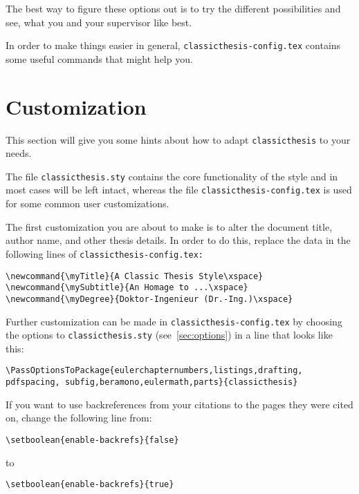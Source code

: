 \noindent The best way to figure these options out is to try the different possibilities and see, what you and your supervisor like best.

In order to make things easier in general, \texttt{classicthesis-config.tex} contains some useful commands that might help you.


\section{Customization}\label{sec:custom}

This section will give you some hints about how to adapt \texttt{classicthesis} to your needs.

The file \texttt{classicthesis.sty} contains the core functionality of the style and in most cases will be left intact, whereas the file \texttt{classic\-thesis-config.tex} is used for some common user customizations. 

The first customization you are about to make is to alter the document title, author name, and other thesis details. In order to do this, replace the data in the following lines of \texttt{classicthesis-config.tex:}

\begin{lstlisting}[frame=lt]
\newcommand{\myTitle}{A Classic Thesis Style\xspace}
\newcommand{\mySubtitle}{An Homage to ...\xspace}
\newcommand{\myDegree}{Doktor-Ingenieur (Dr.-Ing.)\xspace}
\end{lstlisting}

Further customization can be made in \texttt{classicthesis-config.tex} by choosing the options to \texttt{classicthesis.sty} (see~\autoref{sec:options}) in a line that looks like this:

\begin{lstlisting}[frame=lt]
\PassOptionsToPackage{eulerchapternumbers,listings,drafting, pdfspacing, subfig,beramono,eulermath,parts}{classicthesis}

\end{lstlisting}

If you want to use backreferences from your citations to the pages they were cited on, change the following line from:
\begin{lstlisting}[breaklines=false,frame=lt]
\setboolean{enable-backrefs}{false}
\end{lstlisting}
to
\begin{lstlisting}[breaklines=false,frame=lt]
\setboolean{enable-backrefs}{true}
\end{lstlisting}

